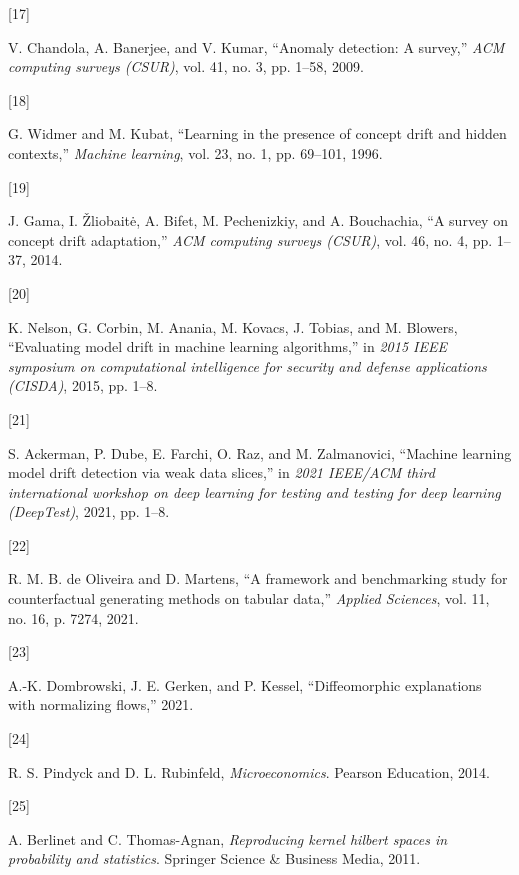 \documentclass[
  conference]{IEEEtran}
\newlength{\cslhangindent}
\newlength{\csllabelwidth}
\newlength{\cslentryspacingunit} %
\newenvironment{CSLReferences}[2] %
 {%
  \setlength{\parindent}{0pt}
  \ifodd #1
  \let\oldpar\par
  \def\par{\hangindent=\cslhangindent\oldpar}
  \fi
  \setlength{\parskip}{#2\cslentryspacingunit}
 }%
 {}
\newcommand{\CSLLeftMargin}[1]{\parbox[t]{\csllabelwidth}{#1}}
\newcommand{\CSLRightInline}[1]{\parbox[t]{\linewidth - \csllabelwidth}{#1}\break}
\begin{document}
\begin{CSLReferences}{0}{0}
\leavevmode{}%
\CSLLeftMargin{{[}17{]} }%
\CSLRightInline{V. Chandola, A. Banerjee, and V. Kumar, {``Anomaly
detection: A survey,''} \emph{ACM computing surveys (CSUR)}, vol. 41,
no. 3, pp. 1--58, 2009.}

\leavevmode{}%
\CSLLeftMargin{{[}18{]} }%
\CSLRightInline{G. Widmer and M. Kubat, {``Learning in the presence of
concept drift and hidden contexts,''} \emph{Machine learning}, vol. 23,
no. 1, pp. 69--101, 1996.}

\leavevmode{}%
\CSLLeftMargin{{[}19{]} }%
\CSLRightInline{J. Gama, I. Žliobaitė, A. Bifet, M. Pechenizkiy, and A.
Bouchachia, {``A survey on concept drift adaptation,''} \emph{ACM
computing surveys (CSUR)}, vol. 46, no. 4, pp. 1--37, 2014.}

\leavevmode{}%
\CSLLeftMargin{{[}20{]} }%
\CSLRightInline{K. Nelson, G. Corbin, M. Anania, M. Kovacs, J. Tobias,
and M. Blowers, {``Evaluating model drift in machine learning
algorithms,''} in \emph{2015 IEEE symposium on computational
intelligence for security and defense applications (CISDA)}, 2015, pp.
1--8.}

\leavevmode{}%
\CSLLeftMargin{{[}21{]} }%
\CSLRightInline{S. Ackerman, P. Dube, E. Farchi, O. Raz, and M.
Zalmanovici, {``Machine learning model drift detection via weak data
slices,''} in \emph{2021 IEEE/ACM third international workshop on deep
learning for testing and testing for deep learning (DeepTest)}, 2021,
pp. 1--8.}

\leavevmode{}%
\CSLLeftMargin{{[}22{]} }%
\CSLRightInline{R. M. B. de Oliveira and D. Martens, {``A framework and
benchmarking study for counterfactual generating methods on tabular
data,''} \emph{Applied Sciences}, vol. 11, no. 16, p. 7274, 2021.}

\leavevmode{}%
\CSLLeftMargin{{[}23{]} }%
\CSLRightInline{A.-K. Dombrowski, J. E. Gerken, and P. Kessel,
{``Diffeomorphic explanations with normalizing flows,''} 2021.}

\leavevmode{}%
\CSLLeftMargin{{[}24{]} }%
\CSLRightInline{R. S. Pindyck and D. L. Rubinfeld,
\emph{Microeconomics}. Pearson Education, 2014.}

\leavevmode{}%
\CSLLeftMargin{{[}25{]} }%
\CSLRightInline{A. Berlinet and C. Thomas-Agnan, \emph{Reproducing
kernel hilbert spaces in probability and statistics}. Springer Science
\& Business Media, 2011.}


\end{CSLReferences}
\end{document}
